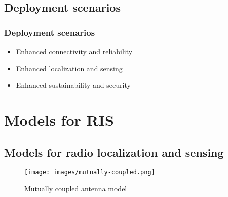 \documentclass{beamer}
\let\olditem\item
\renewcommand\item{\olditem\justifying}
\begin{document}
\subsection{Deployment scenarios}
\begin{frame}
	\frametitle{Deployment scenarios}
	
	\begin{itemize}\setlength\itemsep{1.5em}
		\item Enhanced connectivity and reliability
		\item Enhanced localization and sensing
		\item Enhanced sustainability and security
	\end{itemize}
\end{frame}


\section{Models for RIS}

\subsection{Models for radio localization and sensing}


\begin{frame}
	\supercite{gradoni2020endtoendmutualcouplingaware}
	
	\begin{figure}
		\centering
		\texttt{[image: images/mutually-coupled.png]}
		\caption{Mutually coupled antenna model}
		\label{fig:mutually-coupled}
	\end{figure}
\end{frame}
\end{document}
